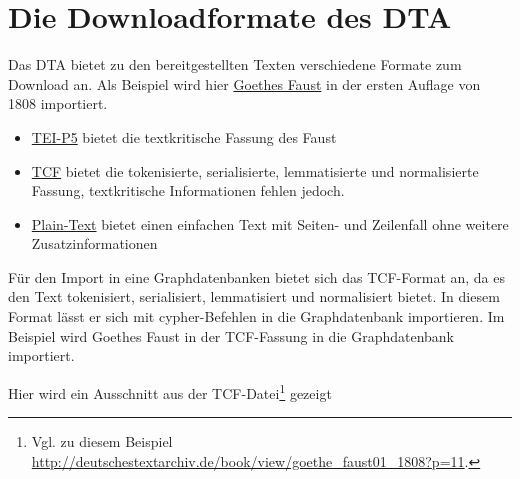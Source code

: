 \documentclass[ngerman,]{scrreprt}
\providecommand{\tightlist}{%
  \setlength{\itemsep}{0pt}\setlength{\parskip}{0pt}}
\begin{document}
\section{Die Downloadformate des DTA}\label{die-downloadformate-des-dta}

Das DTA bietet zu den bereitgestellten Texten verschiedene Formate zum Download an. Als Beispiel wird hier \href{http://deutschestextarchiv.de/book/show/goethe_faust01_1808}{Goethes Faust} in der ersten Auflage von 1808 importiert.

\begin{itemize}
\tightlist
\item
  \href{http://deutschestextarchiv.de/book/download_xml/goethe_faust01_1808}{TEI-P5} bietet die textkritische Fassung des Faust
\item
  \href{http://deutschestextarchiv.de/book/download_fulltcf/16181}{TCF} bietet die tokenisierte, serialisierte, lemmatisierte und normalisierte Fassung, textkritische Informationen fehlen jedoch.
\item
  \href{http://deutschestextarchiv.de/book/download_txt/goethe_faust01_1808}{Plain-Text} bietet einen einfachen Text mit Seiten- und Zeilenfall ohne weitere Zusatzinformationen
\end{itemize}

Für den Import in eine Graphdatenbanken bietet sich das TCF-Format an, da es den Text tokenisiert, serialisiert, lemmatisiert und normalisiert bietet. In diesem Format lässt er sich mit cypher-Befehlen in die Graphdatenbank importieren. Im Beispiel wird Goethes Faust in der TCF-Fassung in die Graphdatenbank importiert.

Hier wird ein Ausschnitt aus der TCF-Datei\footnote{Vgl. zu diesem Beispiel \url{http://deutschestextarchiv.de/book/view/goethe_faust01_1808?p=11}.} gezeigt
\end{document}
